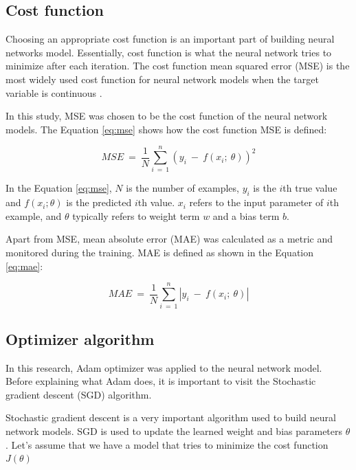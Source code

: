 \documentclass[a4paper, twoside]{templates/ociamthesis}
\begin{document}
\hypertarget{cost-function}{%
\subsection{Cost function}\label{cost-function}}

Choosing an appropriate cost function is an important part of building neural networks model. Essentially, cost function is what the neural network tries to minimize after each iteration. The cost function mean squared error (MSE) is the most widely used cost function for neural network models when the target variable is continuous \citep{allaire2018deep}.

In this study, MSE was chosen to be the cost function of the neural network models. The Equation \eqref{eq:mse} shows how the cost function MSE is defined:

\begin{equation}
MSE\ =\ \frac{1}{N}\sum_{i\ =\ 1}^n\left(y_i\ -\ f\left(x_i;\ \theta\right)\right)^2
\label{eq:mse}
\end{equation}

In the Equation \eqref{eq:mse}, \(N\) is the number of examples, \(y_{i}\) is the \(i\)th true value and \(f(x_{i}; \theta)\) is the predicted \(i\)th value. \(x_{i}\) refers to the input parameter of \(i\)th example, and \(\theta\) typically refers to weight term \(w\) and a bias term \(b\).

Apart from MSE, mean absolute error (MAE) was calculated as a metric and monitored during the training. MAE is defined as shown in the Equation \eqref{eq:mae}:

\begin{equation}
MAE\ =\ \frac{1}{N}\sum_{i\ =\ 1}^n\left|y_i\ -\ f\left(x_i;\ \theta\right)\right|
\label{eq:mae}
\end{equation}

\hypertarget{optimizer-algorithm}{%
\subsection{Optimizer algorithm}\label{optimizer-algorithm}}

In this research, Adam optimizer \citep{kingma2014adam} was applied to the neural network model. Before explaining what Adam does, it is important to visit the Stochastic gradient descent (SGD) algorithm.

Stochastic gradient descent is a very important algorithm used to build neural network models. SGD is used to update the learned weight and bias parameters \(\theta\). Let's assume that we have a model that tries to minimize the cost function \(J(\theta)\)
\end{document}
